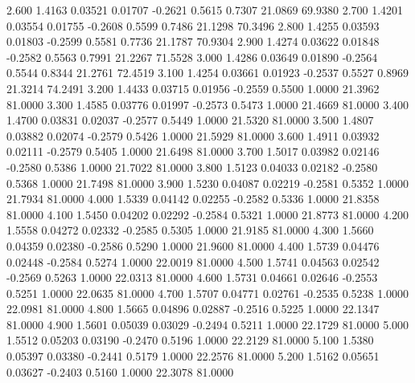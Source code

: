    2.600   1.4163   0.03521   0.01707  -0.2621   0.5615   0.7307  21.0869  69.9380
   2.700   1.4201   0.03554   0.01755  -0.2608   0.5599   0.7486  21.1298  70.3496
   2.800   1.4255   0.03593   0.01803  -0.2599   0.5581   0.7736  21.1787  70.9304
   2.900   1.4274   0.03622   0.01848  -0.2582   0.5563   0.7991  21.2267  71.5528
   3.000   1.4286   0.03649   0.01890  -0.2564   0.5544   0.8344  21.2761  72.4519
   3.100   1.4254   0.03661   0.01923  -0.2537   0.5527   0.8969  21.3214  74.2491
   3.200   1.4433   0.03715   0.01956  -0.2559   0.5500   1.0000  21.3962  81.0000
   3.300   1.4585   0.03776   0.01997  -0.2573   0.5473   1.0000  21.4669  81.0000
   3.400   1.4700   0.03831   0.02037  -0.2577   0.5449   1.0000  21.5320  81.0000
   3.500   1.4807   0.03882   0.02074  -0.2579   0.5426   1.0000  21.5929  81.0000
   3.600   1.4911   0.03932   0.02111  -0.2579   0.5405   1.0000  21.6498  81.0000
   3.700   1.5017   0.03982   0.02146  -0.2580   0.5386   1.0000  21.7022  81.0000
   3.800   1.5123   0.04033   0.02182  -0.2580   0.5368   1.0000  21.7498  81.0000
   3.900   1.5230   0.04087   0.02219  -0.2581   0.5352   1.0000  21.7934  81.0000
   4.000   1.5339   0.04142   0.02255  -0.2582   0.5336   1.0000  21.8358  81.0000
   4.100   1.5450   0.04202   0.02292  -0.2584   0.5321   1.0000  21.8773  81.0000
   4.200   1.5558   0.04272   0.02332  -0.2585   0.5305   1.0000  21.9185  81.0000
   4.300   1.5660   0.04359   0.02380  -0.2586   0.5290   1.0000  21.9600  81.0000
   4.400   1.5739   0.04476   0.02448  -0.2584   0.5274   1.0000  22.0019  81.0000
   4.500   1.5741   0.04563   0.02542  -0.2569   0.5263   1.0000  22.0313  81.0000
   4.600   1.5731   0.04661   0.02646  -0.2553   0.5251   1.0000  22.0635  81.0000
   4.700   1.5707   0.04771   0.02761  -0.2535   0.5238   1.0000  22.0981  81.0000
   4.800   1.5665   0.04896   0.02887  -0.2516   0.5225   1.0000  22.1347  81.0000
   4.900   1.5601   0.05039   0.03029  -0.2494   0.5211   1.0000  22.1729  81.0000
   5.000   1.5512   0.05203   0.03190  -0.2470   0.5196   1.0000  22.2129  81.0000
   5.100   1.5380   0.05397   0.03380  -0.2441   0.5179   1.0000  22.2576  81.0000
   5.200   1.5162   0.05651   0.03627  -0.2403   0.5160   1.0000  22.3078  81.0000
